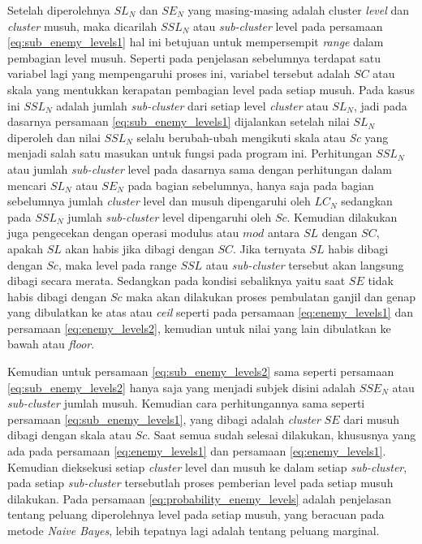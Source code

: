 Setelah diperolehnya $SL_{N}$ dan $SE_{N}$ yang masing-masing adalah cluster \textit{level} dan \textit{cluster} musuh, maka dicarilah $SSL_{N}$ atau \textit{sub-cluster} level pada persamaan \ref{eq:sub_enemy_levels1} hal ini betujuan untuk mempersempit \textit{range} dalam pembagian level musuh. Seperti pada penjelasan sebelumnya terdapat satu variabel lagi yang mempengaruhi proses ini, variabel tersebut adalah $SC$ atau skala yang mentukkan kerapatan pembagian level pada setiap musuh. Pada kasus ini $SSL_{N}$ adalah jumlah \textit{sub-cluster} dari setiap level \textit{cluster} atau $SL_{N}$, jadi pada dasarnya persamaan \ref{eq:sub_enemy_levels1} dijalankan setelah nilai $SL_{N}$ diperoleh dan nilai $SSL_{N}$ selalu berubah-ubah mengikuti skala atau \textit{Sc} yang menjadi salah satu masukan untuk fungsi pada program ini. Perhitungan $SSL_{N}$ atau jumlah \textit{sub-cluster} level pada dasarnya sama dengan perhitungan dalam mencari $SL_{N}$ atau $SE_{N}$ pada bagian sebelumnya, hanya saja pada bagian sebelumnya jumlah \textit{cluster} level dan musuh dipengaruhi oleh $LC_{N}$ sedangkan pada $SSL_{N}$ jumlah \textit{sub-cluster} level dipengaruhi oleh $Sc$. Kemudian dilakukan juga pengecekan dengan operasi modulus atau $mod$ antara $SL$ dengan $SC$, apakah $SL$ akan habis jika dibagi dengan $SC$. Jika ternyata $SL$ habis dibagi dengan $Sc$, maka level pada range $SSL$ atau \textit{sub-cluster} tersebut akan langsung dibagi secara merata. Sedangkan pada kondisi sebaliknya yaitu saat $SE$ tidak habis dibagi dengan $Sc$ maka akan dilakukan proses pembulatan ganjil dan genap yang dibulatkan ke atas atau \textit{ceil} seperti pada persamaan \ref{eq:enemy_levels1} dan persamaan \ref{eq:enemy_levels2}, kemudian untuk nilai yang lain dibulatkan ke bawah atau \textit{floor}.
\vspace{1ex}

Kemudian untuk persamaan \ref{eq:sub_enemy_levels2} sama seperti persamaan \ref{eq:sub_enemy_levels2} hanya saja yang menjadi subjek disini adalah $SSE_{N}$ atau \textit{sub-cluster} jumlah musuh. Kemudian cara perhitungannya sama seperti persamaan \ref{eq:sub_enemy_levels1}, yang dibagi adalah \textit{cluster} $SE$ dari musuh dibagi dengan skala atau $Sc$. Saat semua sudah selesai dilakukan, khususnya yang ada pada persamaan \ref{eq:enemy_levels1} dan persamaan \ref{eq:enemy_levels1}. Kemudian dieksekusi setiap \textit{cluster} level dan musuh ke dalam setiap \textit{sub-cluster}, pada setiap \textit{sub-cluster} tersebutlah proses pemberian level pada setiap musuh dilakukan. Pada persamaan \ref{eq:probability_enemy_levels} adalah penjelasan tentang peluang diperolehnya level pada setiap musuh, yang beracuan pada metode \textit{Naive Bayes}, lebih tepatnya lagi adalah tentang peluang marginal.
\vspace{1ex}

